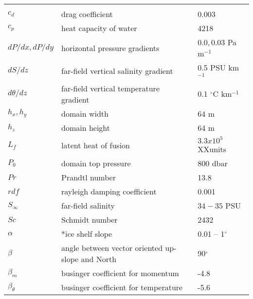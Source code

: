     \begin{table}[h]
    \caption{    }
    \label{table:var}
    \begin{center}
    \begin{tabular}{lll}
    \multicolumn{3}{c}{}\\
	
	$c_d$           & drag coefficient & 0.003 \\
    $c_p$       & heat capacity of water    & 4218\\   
	$dP/dx,dP/dy$   & horizontal pressure gradients & $0.0,0.03$ Pa m$^{-1}$\\
	$dS/dz$   & far-field vertical salinity gradient & 0.5 PSU km$^{-1}$\\
	$d\theta/dz$   & far-field vertical temperature gradient & 0.1 $^{\circ}$C km$^{-1}$\\
	$h_x,h_y$       & domain width              & 64 m\\
	$h_z$           & domain height             & 64 m\\ 
    $L_f$           & latent heat of fusion     & $3.3 x 10^5$ XXunits\\
	$P_0$           & domain top pressure          & 800 dbar\\
	$Pr$           & Prandtl number      & 13.8\\
	$rdf$           & rayleigh damping coefficient & 0.001\\
	$S_{\infty}$      & far-field salinity     & $34 - 35$ PSU \\
	$Sc$           & Schmidt number      & 2432\\
	$\alpha$        & *ice shelf slope           & 0.01 -- 1$^{\circ}$ \\
	$\beta$         & angle between vector oriented up-slope and North & 90$^{\circ}$\\%
	$\beta_m$         & businger coefficient for momentum & -4.8 \\
	$\beta_{\theta}$         & businger coefficient for temperature & -5.6 \\

\end{tabular}
\end{center}
\end{table}
